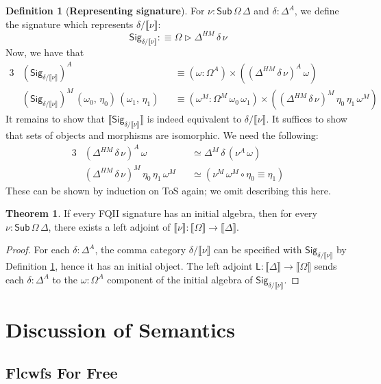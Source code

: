 \documentclass[12pt,a4paper,twoside,openany]{book}
\theoremstyle{remark}
\theoremstyle{definition}
\newtheorem{mydefinition}{Definition}
\theoremstyle{theorem}
\newtheorem{theorem}{Theorem}
\newcommand{\ms}[1]{\mathsf{#1}}
\newcommand{\Sub}{\mathsf{Sub}}
\newcommand{\ext}{\triangleright}
\newcommand{\llb}{\llbracket}
\newcommand{\rrb}{\rrbracket}
\newcommand{\sem}[1]{\llb#1\rrb}
\newcommand{\defn}{:\equiv}
\begin{document}
\begin{mydefinition}[\textbf{Representing signature}]
\label{def:fqii-rep-signature}
\noindent For $\nu : \Sub\,\Omega\,\Delta$ and $\delta : \Delta^A$, we define the
signature which represents $\delta/\sem{\nu}$:
\[
  \ms{Sig}_{\delta/\sem{\nu}} \defn \Omega \ext \Delta^{HM}\,\delta\,\nu
\]
Now, we have that
\begin{alignat*}{3}
  &(\ms{Sig}_{\delta/\sem{\nu}})^A &&\equiv (\omega : \Omega^A) \times ((\Delta^{HM}\,\delta\,\nu)^A\,\omega)\\
  &(\ms{Sig}_{\delta/\sem{\nu}})^M\,(\omega_0,\,\eta_0)\,(\omega_1,\,\eta_1) &&\equiv (\omega^M : \Omega^M\,\omega_0\,\omega_1) \times ((\Delta^{HM}\,\delta\,\nu)^M\,\eta_0\,\eta_1\,\omega^M)
\end{alignat*}
It remains to show that $\sem{\ms{Sig}_{\delta/\sem{\nu}}}$ is indeed equivalent
to $\delta/\sem{\nu}$. It suffices to show that sets of objects and morphisms
are isomorphic. We need the following:
\begin{alignat*}{3}
  & (\Delta^{HM}\,\delta\,\nu)^A\,\omega &&\simeq \Delta^M\,\delta\,(\nu^A\,\omega)\\
  & (\Delta^{HM}\,\delta\,\nu)^M\,\eta_0\,\eta_1\,\omega^M &&\simeq (\nu^M\,\omega^M \circ \eta_0 \equiv \eta_1)
\end{alignat*}
These can be shown by induction on ToS again; we omit describing this here.
\end{mydefinition}

\begin{theorem}
If every FQII signature has an initial algebra, then for every $\nu :
\Sub\,\Omega\,\Delta$, there exists a left adjoint of $\sem{\nu} : \sem{\Omega} \to \sem{\Delta}$.
\end{theorem}
\begin{proof}
For each $\delta : \Delta^A$, the comma category $\delta/\sem{\nu}$ can be
specified with $\ms{Sig}_{\delta/\sem{\nu}}$ by Definition
\ref{def:fqii-rep-signature}, hence it has an initial object. The left adjoint
$\ms{L} : \sem{\Delta} \to \sem{\Omega}$ sends each $\delta : \Delta^A$ to the
$\omega : \Omega^A$ component of the initial algebra of
$\ms{Sig}_{\delta/\sem{\nu}}$.
\end{proof}


\section{Discussion of Semantics}

\subsection{Flcwfs For Free}
\end{document}
